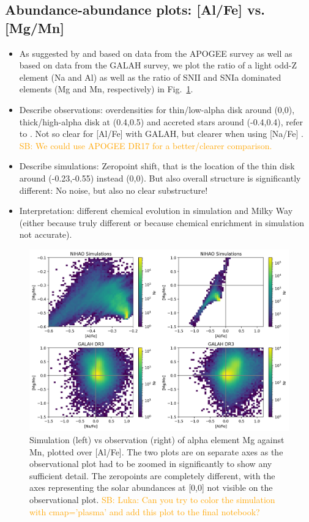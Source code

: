 \documentclass[fleqn,usenatbib]{mnras}
\newcommand{\SB}[1]{{\textcolor{orange}{SB: #1}}}
\begin{document}
\subsection{Abundance-abundance plots: [Al/Fe] vs. [Mg/Mn]} \label{sec:alfe_mgmn}

\begin{itemize}
    \item As suggested by \citet{Hawkins2015} and \citet{Das2020} based on data from the APOGEE survey as well as \citet{Buder2022} based on data from the GALAH survey, we plot the ratio of a light odd-Z element (Na and Al) as well as the ratio of SNII and SNIa dominated elements (Mg and Mn, respectively) in Fig.~\ref{fig:alfe_mgmn}.
    \item Describe observations: overdensities for thin/low-alpha disk around (0,0), thick/high-alpha disk at (0.4,0.5) and accreted stars around (-0.4,0.4), refer to \citet{Das2020, Horta2021}. Not so clear for [Al/Fe] with GALAH, but clearer when using [Na/Fe] \citep{Buder2022}. \SB{We could use APOGEE DR17 for a better/clearer comparison.}
    \item Describe simulations: Zeropoint shift, that is the location of the thin disk around (-0.23,-0.55) instead (0,0). But also overall structure is significantly different: No noise, but also no clear substructure!
    \item Interpretation: different chemical evolution in simulation and Milky Way (either because truly different or because chemical enrichment in simulation not accurate).
\end{itemize}

\begin{figure}
	\includegraphics[width=\textwidth]{figures/[MgMn] vs [AlFe].png}
    \caption{Simulation (left) vs observation (right) of alpha element Mg against Mn, plotted over [Al/Fe]. The two plots are on separate axes as the observational plot had to be zoomed in significantly to show any sufficient detail. The zeropoints are completely different, with the axes representing the solar abundances at [0,0] not visible on the observational plot. \SB{Luka: Can you try to color the simulation with cmap='plasma' and add this plot to the final notebook?}}
    \label{fig:alfe_mgmn}
\end{figure}
\end{document}
